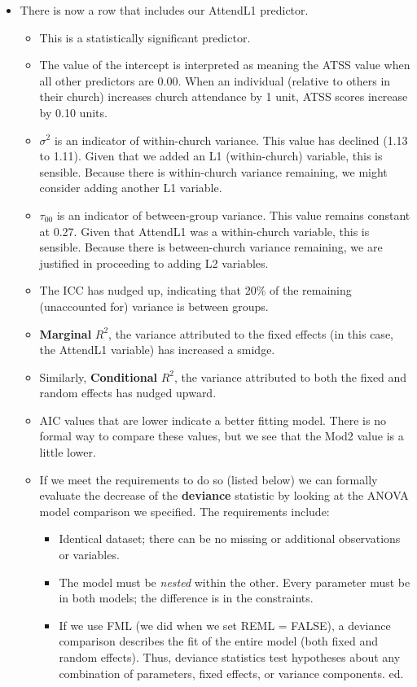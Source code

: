 \documentclass[
  english,
]{book}
\providecommand{\tightlist}{%
  \setlength{\itemsep}{0pt}\setlength{\parskip}{0pt}}
\begin{document}
\begin{itemize}
\tightlist
\item
  There is now a row that includes our AttendL1 predictor.

  \begin{itemize}
  \tightlist
  \item
    This is a statistically significant predictor.
  \item
    The value of the intercept is interpreted as meaning the ATSS value when all other predictors are 0.00. When an individual (relative to others in their church) increases church attendance by 1 unit, ATSS scores increase by 0.10 units.
  \item
    \(\sigma^{2}\) is an indicator of within-church variance. This value has declined (1.13 to 1.11). Given that we added an L1 (within-church) variable, this is sensible. Because there is within-church variance remaining, we might consider adding another L1 variable.
  \item
    \(\tau _{00}\) is an indicator of between-group variance. This value remains constant at 0.27. Given that AttendL1 was a within-church variable, this is sensible. Because there is between-church variance remaining, we are justified in proceeding to adding L2 variables.
  \item
    The ICC has nudged up, indicating that 20\% of the remaining (unaccounted for) variance is between groups.
  \item
    \textbf{Marginal} \(R^2\), the variance attributed to the fixed effects (in this case, the AttendL1 variable) has increased a smidge.
  \item
    Similarly, \textbf{Conditional} \(R^2\), the variance attributed to both the fixed and random effects has nudged upward.
  \item
    AIC values that are lower indicate a better fitting model. There is no formal way to compare these values, but we see that the Mod2 value is a little lower.
  \item
    If we meet the requirements to do so (listed below) we can formally evaluate the decrease of the \textbf{deviance} statistic by looking at the ANOVA model comparison we specified. The requirements include:

    \begin{itemize}
    \tightlist
    \item
      Identical dataset; there can be no missing or additional observations or variables.
    \item
      The model must be \emph{nested} within the other. Every parameter must be in both models; the difference is in the constraints.
    \item
      If we use FML (we did when we set REML = FALSE), a deviance comparison describes the fit of the entire model (both fixed and random effects). Thus, deviance statistics test hypotheses about any combination of parameters, fixed effects, or variance components.
      ed.
    \end{itemize}
  \end{itemize}
\end{itemize}
\end{document}

